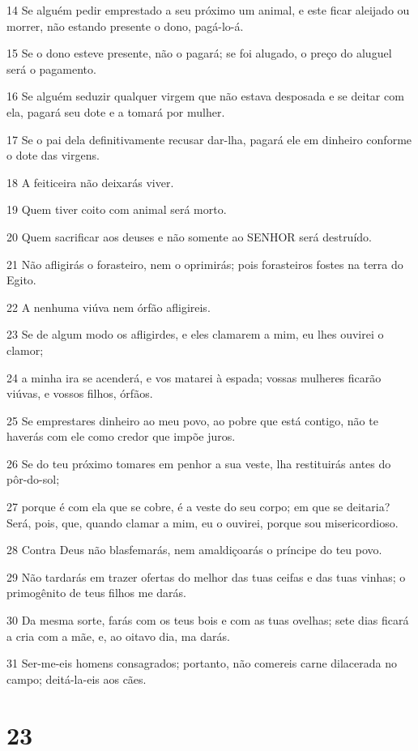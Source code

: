 \par 14 Se alguém pedir emprestado a seu próximo um animal, e este ficar aleijado ou morrer, não estando presente o dono, pagá-lo-á.
\par 15 Se o dono esteve presente, não o pagará; se foi alugado, o preço do aluguel será o pagamento.
\par 16 Se alguém seduzir qualquer virgem que não estava desposada e se deitar com ela, pagará seu dote e a tomará por mulher.
\par 17 Se o pai dela definitivamente recusar dar-lha, pagará ele em dinheiro conforme o dote das virgens.
\par 18 A feiticeira não deixarás viver.
\par 19 Quem tiver coito com animal será morto.
\par 20 Quem sacrificar aos deuses e não somente ao SENHOR será destruído.
\par 21 Não afligirás o forasteiro, nem o oprimirás; pois forasteiros fostes na terra do Egito.
\par 22 A nenhuma viúva nem órfão afligireis.
\par 23 Se de algum modo os afligirdes, e eles clamarem a mim, eu lhes ouvirei o clamor;
\par 24 a minha ira se acenderá, e vos matarei à espada; vossas mulheres ficarão viúvas, e vossos filhos, órfãos.
\par 25 Se emprestares dinheiro ao meu povo, ao pobre que está contigo, não te haverás com ele como credor que impõe juros.
\par 26 Se do teu próximo tomares em penhor a sua veste, lha restituirás antes do pôr-do-sol;
\par 27 porque é com ela que se cobre, é a veste do seu corpo; em que se deitaria? Será, pois, que, quando clamar a mim, eu o ouvirei, porque sou misericordioso.
\par 28 Contra Deus não blasfemarás, nem amaldiçoarás o príncipe do teu povo.
\par 29 Não tardarás em trazer ofertas do melhor das tuas ceifas e das tuas vinhas; o primogênito de teus filhos me darás.
\par 30 Da mesma sorte, farás com os teus bois e com as tuas ovelhas; sete dias ficará a cria com a mãe, e, ao oitavo dia, ma darás.
\par 31 Ser-me-eis homens consagrados; portanto, não comereis carne dilacerada no campo; deitá-la-eis aos cães.

\chapter{23}

